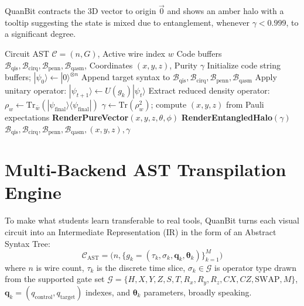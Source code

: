\documentclass[conference]{IEEEtran}
\begin{document}
QuanBit contracts the 3D vector to origin $\vec{0}$ and shows an amber halo with a tooltip suggesting the state is mixed due to entanglement, whenever $\gamma < 0.999$, to a significant degree.

\begin{algorithm}[t]
\caption{Multi-Backend AST Transpilation \& State Extraction}
\label{alg:transpile}
\footnotesize
\begin{algorithmic}[1]
\REQUIRE Circuit AST $\mathcal{C} = (n, G)$, Active wire index $w$
\ENSURE Code buffers $\mathcal{B}_{\text{qis}}, \mathcal{B}_{\text{cirq}}, \mathcal{B}_{\text{penn}}, \mathcal{B}_{\text{qasm}}$, Coordinates $(x,y,z)$, Purity $\gamma$
\STATE Initialize code string buffers; $|\psi_0\rangle \leftarrow |0\rangle^{\otimes n}$
    \STATE Append target syntax to $\mathcal{B}_{\text{qis}}, \mathcal{B}_{\text{cirq}}, \mathcal{B}_{\text{penn}}, \mathcal{B}_{\text{qasm}}$
    \STATE Apply unitary operator: $|\psi_{t+1}\rangle \leftarrow U(g_k) |\psi_t\rangle$
\ENDFOR
\STATE Extract reduced density operator: $\rho_w \leftarrow \text{Tr}_{\bar{w}}(|\psi_{\text{final}}\rangle\langle\psi_{\text{final}}|)$
\STATE $\gamma \leftarrow \text{Tr}(\rho_w^2)$; compute $(x, y, z)$ from Pauli expectations
    \STATE \textbf{RenderPureVector}$(x, y, z, \theta, \phi)$
\ELSE
    \STATE \textbf{RenderEntangledHalo}$(\gamma)$
\ENDIF
\RETURN $\mathcal{B}_{\text{qis}}, \mathcal{B}_{\text{cirq}}, \mathcal{B}_{\text{penn}}, \mathcal{B}_{\text{qasm}}, (x,y,z), \gamma$
\end{algorithmic}
\end{algorithm}

\section{Multi-Backend AST Transpilation Engine}
\label{sec:transpiler}

To make what students learn transferable to real tools, QuanBit turns each visual circuit into an Intermediate Representation (IR) in the form of an Abstract Syntax Tree:
\begin{equation}
\mathcal{C}_{\text{AST}} = \big( n, \{ g_k = (\tau_k, \sigma_k, \mathbf{q}_k, \boldsymbol{\theta}_k) \}_{k=1}^M \big)
\end{equation}
where $n$ is wire count, $\tau_k$ is the discrete time slice, $\sigma_k \in \mathcal{G}$ is operator type drawn from the supported gate set $\mathcal{G} = \{ H, X, Y, Z, S, T, R_x, R_y, R_z, CX, CZ, \text{SWAP}, M \}$, $\mathbf{q}_k = (q_{\text{control}}, q_{\text{target}})$ indexes, and $\boldsymbol{\theta}_k$ parameters, broadly speaking.
\end{document}

